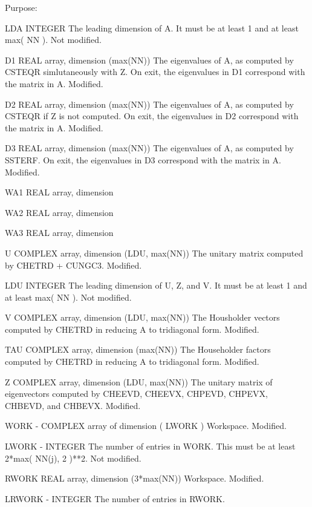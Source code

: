 \begin{DoxyParagraph}{Purpose\+: }
\begin{DoxyVerb}
  LDA     INTEGER
          The leading dimension of A.  It must be at
          least 1 and at least max( NN ).
          Not modified.

  D1      REAL array, dimension (max(NN))
          The eigenvalues of A, as computed by CSTEQR simlutaneously
          with Z.  On exit, the eigenvalues in D1 correspond with the
          matrix in A.
          Modified.

  D2      REAL array, dimension (max(NN))
          The eigenvalues of A, as computed by CSTEQR if Z is not
          computed.  On exit, the eigenvalues in D2 correspond with
          the matrix in A.
          Modified.

  D3      REAL array, dimension (max(NN))
          The eigenvalues of A, as computed by SSTERF.  On exit, the
          eigenvalues in D3 correspond with the matrix in A.
          Modified.

  WA1     REAL array, dimension

  WA2     REAL array, dimension

  WA3     REAL array, dimension

  U       COMPLEX array, dimension (LDU, max(NN))
          The unitary matrix computed by CHETRD + CUNGC3.
          Modified.

  LDU     INTEGER
          The leading dimension of U, Z, and V.  It must be at
          least 1 and at least max( NN ).
          Not modified.

  V       COMPLEX array, dimension (LDU, max(NN))
          The Housholder vectors computed by CHETRD in reducing A to
          tridiagonal form.
          Modified.

  TAU     COMPLEX array, dimension (max(NN))
          The Householder factors computed by CHETRD in reducing A
          to tridiagonal form.
          Modified.

  Z       COMPLEX array, dimension (LDU, max(NN))
          The unitary matrix of eigenvectors computed by CHEEVD,
          CHEEVX, CHPEVD, CHPEVX, CHBEVD, and CHBEVX.
          Modified.

  WORK  - COMPLEX array of dimension ( LWORK )
           Workspace.
           Modified.

  LWORK - INTEGER
           The number of entries in WORK.  This must be at least
           2*max( NN(j), 2 )**2.
           Not modified.

  RWORK   REAL array, dimension (3*max(NN))
           Workspace.
           Modified.

  LRWORK - INTEGER
           The number of entries in RWORK.


\end{DoxyVerb}
\end{DoxyParagraph}
